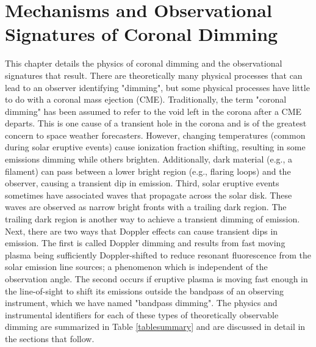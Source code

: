 \chapter{Mechanisms and Observational Signatures of Coronal Dimming}
\label{chaptermechanisms}

This chapter details the physics of coronal dimming and the observational signatures that result. There are theoretically many physical processes that can lead to an observer identifying "dimming", but some physical processes have little to do with a coronal mass ejection (CME). Traditionally, the term "coronal dimming" has been assumed to refer to the void left in the corona after a CME departs. This is one cause of a transient hole in the corona and is of the greatest concern to space weather forecasters. However, changing temperatures (common during solar eruptive events) cause ionization fraction shifting, resulting in some emissions dimming while others brighten. Additionally, dark material (e.g., a filament) can pass between a lower bright region (e.g., flaring loops) and the observer, causing a transient dip in emission. Third, solar eruptive events sometimes have associated waves that propagate across the solar disk. These waves are observed as narrow bright fronts with a trailing dark region. The trailing dark region is another way to achieve a transient dimming of emission. Next, there are two ways that Doppler effects can cause transient dips in emission. The first is called Doppler dimming and results from fast moving plasma being sufficiently Doppler-shifted to reduce resonant fluorescence from the solar emission line sources; a phenomenon which is independent of the observation angle. The second occurs if eruptive plasma is moving fast enough in the line-of-sight to shift its emissions outside the bandpass of an observing instrument, which we have named "bandpass dimming". The physics and instrumental identifiers for each of these types of theoretically observable dimming are summarized in Table \ref{tablesummary} and are discussed in detail in the sections that follow.

